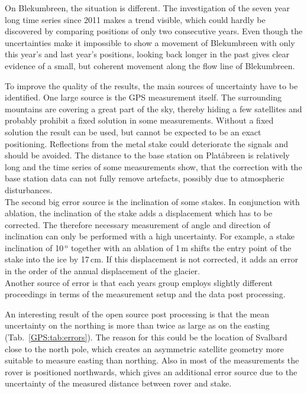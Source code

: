 On Blekumbreen, the situation is different.
The investigation of the seven year long time series since 2011 makes a trend visible,
which could hardly be discovered by comparing positions of only two consecutive years.
Even though the uncertainties make it impossible to show a movement of Blekumbreen with only this year's
and last year's positions,
looking back longer in the past gives clear evidence of a small, but coherent movement along the flow line of Blekumbreen.

To improve the quality of the results,
the main sources of uncertainty have to be identified.
One large source is the GPS measurement itself.
The surrounding mountains are covering a great part of the sky,
thereby hiding a few satellites and probably prohibit a fixed solution in some measurements.
Without a fixed solution the result can be used, but cannot be expected to be an exact positioning.
Reflections from the metal stake could deteriorate the signals and should be avoided.
The distance to the base station on Platåbreen is relatively long and the time series of some measurements show,
that the correction with the base station data can not fully remove artefacts,
possibly due to atmospheric disturbances.\\
The second big error source is the inclination of some stakes.
In conjunction with ablation, the inclination of the stake adds a displacement which has to be corrected.
The therefore necessary measurement of angle and direction of inclination can only be performed with a high uncertainty.
For example, a stake inclination of 10\,$^\text{o}$ together with an ablation of 1\,m shifts the entry point of the stake
into the ice by 17\,cm.
If this displacement is not corrected,
it adds an error in the order of the annual displacement of the glacier.\\
Another source of error is that each years group employs slightly different proceedings in terms
of the measurement setup and the data post processing.

An interesting result of the open source post processing is that the mean uncertainty on the northing is
more than twice as large as on the easting (Tab.~\ref{GPS:tab:errors}).
The reason for this could be the location of Svalbard close to the north pole,
which creates an asymmetric satellite geometry more suitable to measure easting than northing.
Also in most of the measurements the rover is positioned northwards, 
which gives an additional error source due to the uncertainty of the measured distance between rover and stake.


